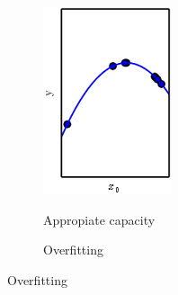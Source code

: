 \begin{figure}
\begin{subfigure}[b]{0.3\textwidth}
        \label{fig:y equals x}
    \end{subfigure}
    \hfill
    \begin{subfigure}[b]{0.3\textwidth}
        \centering
        \caption{Appropiate capacity}
        \includegraphics[width=\textwidth]{Figures/appropiate}
        \label{fig:three sin x}
    \end{subfigure}
    \hfill
    \begin{subfigure}[b]{0.3\textwidth}
        \centering
        \caption{Overfitting}

\end{subfigure}
\end{figure}
